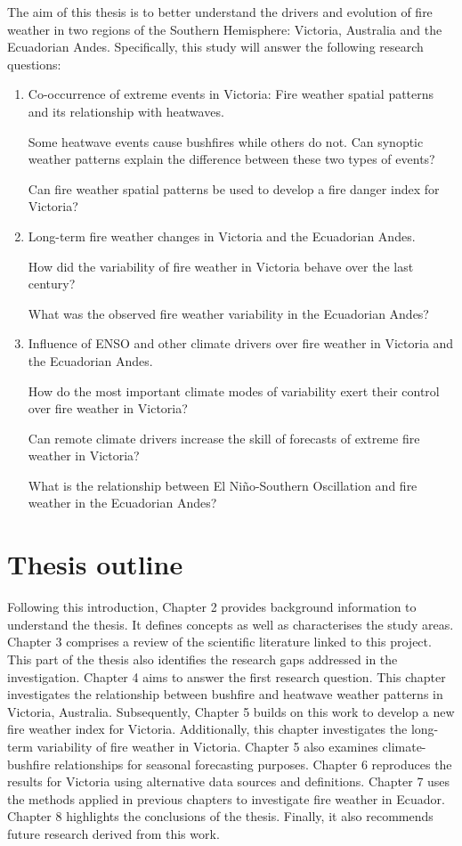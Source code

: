 The aim of this thesis is to better understand the drivers and evolution
of fire weather in two regions of the Southern Hemisphere: Victoria,
Australia and the Ecuadorian Andes. Specifically, this study will
answer the following research questions:
\begin{enumerate}
\item Co-occurrence of extreme events in Victoria: Fire weather spatial
patterns and its relationship with heatwaves. 


\textbullet{} Some heatwave events cause bushfires while others do
not. Can synoptic weather patterns explain the difference between
these two types of events? 


\textbullet Can fire weather spatial patterns be used to develop a
fire danger index for Victoria?

\item Long-term fire weather changes in Victoria and the Ecuadorian Andes.


\textbullet How did the variability of fire weather in Victoria behave
over the last century?


\textbullet{} What was the observed fire weather variability in the
Ecuadorian Andes?

\item Influence of ENSO and other climate drivers over fire weather in Victoria
and the Ecuadorian Andes.


\textbullet{} How do the most important climate modes of variability
exert their control over fire weather in Victoria?


\textbullet{} Can remote climate drivers increase the skill of forecasts
of extreme fire weather in Victoria? 


\textbullet{} What is the relationship between El Ni\~no-Southern Oscillation
and fire weather in the Ecuadorian Andes?

\end{enumerate}

\section{Thesis outline}

Following this introduction, Chapter 2 provides background information
to understand the thesis. It defines concepts as well as characterises
the study areas. Chapter 3 comprises a review of the scientific literature
linked to this project. This part of the thesis also identifies the
research gaps addressed in the investigation. Chapter 4 aims to answer
the first research question. This chapter investigates the relationship
between bushfire and heatwave weather patterns in Victoria, Australia.
Subsequently, Chapter 5 builds on this work to develop a new fire
weather index for Victoria. Additionally, this chapter investigates
the long-term variability of fire weather in Victoria. Chapter 5 also
examines climate-bushfire relationships for seasonal forecasting purposes.
Chapter 6 reproduces the results for Victoria using alternative data
sources and definitions. Chapter 7 uses the methods applied in previous
chapters to investigate fire weather in Ecuador. Chapter 8 highlights
the conclusions of the thesis. Finally, it also recommends future
research derived from this work.
